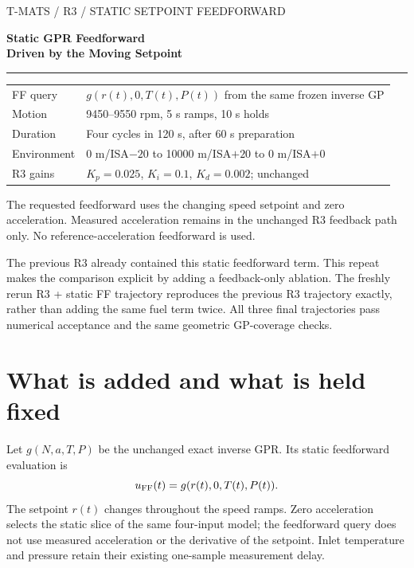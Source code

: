 \documentclass[11pt,a4paper]{article}
\begin{document}
\begin{titlepage}\color{navy}\sffamily
{\small T-MATS / R3 / STATIC SETPOINT FEEDFORWARD}\par\vspace{22mm}
{\fontsize{30}{36}\selectfont\bfseries Static GPR Feedforward\\Driven by the Moving Setpoint\par}
\vspace{12mm}{\Large Base PI, R3 feedback-only, and R3 + GPR FF\par}
\vspace{10mm}\color{teal}\rule{\linewidth}{1.2pt}\color{navy}\vspace{8mm}
\begin{tabular}{ll}
FF query & $g(r(t),0,T(t),P(t))$ from the same frozen inverse GP\\[5pt]
Motion & 9450--9550 rpm, 5 s ramps, 10 s holds\\[5pt]
Duration & Four cycles in 120 s, after 60 s preparation\\[5pt]
Environment & 0 m/ISA$-20$ to 10000 m/ISA$+20$ to 0 m/ISA$+0$\\[5pt]
R3 gains & $K_p=0.025$, $K_i=0.1$, $K_d=0.002$; unchanged
\end{tabular}
\par\vspace{12mm}\normalfont\color{ink}
The requested feedforward uses the changing speed setpoint and zero acceleration. Measured acceleration remains in the unchanged R3 feedback path only. No reference-acceleration feedforward is used.

The previous R3 already contained this static feedforward term. This repeat makes the comparison explicit by adding a feedback-only ablation. The freshly rerun R3 + static FF trajectory reproduces the previous R3 trajectory exactly, rather than adding the same fuel term twice.
\vfill All three final trajectories pass numerical acceptance and the same geometric GP-coverage checks.
\end{titlepage}
\section{What is added and what is held fixed}
Let $g(N,a,T,P)$ be the unchanged exact inverse GPR. Its static feedforward evaluation is
\begin{equation}u_{\rm FF}(t)=g(r(t),0,T(t),P(t)).\end{equation}
The setpoint $r(t)$ changes throughout the speed ramps. Zero acceleration selects the static slice of the same four-input model; the feedforward query does not use measured acceleration or the derivative of the setpoint. Inlet temperature and pressure retain their existing one-sample measurement delay.
\end{document}

